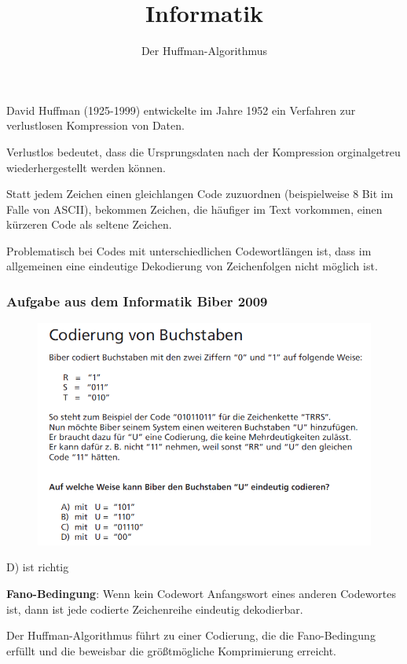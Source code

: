 \documentclass{beamer}
\begin{document}
\title{Informatik}   
\author{Der Huffman-Algorithmus} 
\date{}
\frame{\titlepage} 


\begin{frame}[fragile]
David Huffman (1925-1999) entwickelte im Jahre 1952 ein Verfahren zur verlustlosen Kompression von Daten.  

Verlustlos bedeutet, dass die Ursprungsdaten nach der Kompression orginalgetreu wiederhergestellt 
werden können. \pause

Statt jedem Zeichen einen gleichlangen Code zuzuordnen (beispielweise 8 Bit im Falle von ASCII), bekommen Zeichen, die häufiger im Text vorkommen, einen kürzeren Code als seltene Zeichen.  

Problematisch bei Codes mit unterschiedlichen Codewortlängen ist,  dass im allgemeinen eine eindeutige Dekodierung von Zeichenfolgen nicht möglich ist. 
\end{frame}

\begin{frame}
\frametitle{Aufgabe aus dem Informatik Biber 2009}
\begin{figure}[h]
	\centering
		\includegraphics[scale=0.6]{BiberCode.png}
\end{figure}
\pause
D) ist richtig
\end{frame}


\begin{frame}
\textbf{Fano-Bedingung}: Wenn kein Codewort Anfangswort eines anderen Codewortes ist,
dann ist jede codierte Zeichenreihe eindeutig dekodierbar.

Der Huffman-Algorithmus führt zu einer Codierung, die die Fano-Bedingung erfüllt und die
beweisbar die größtmögliche Komprimierung erreicht.
\end{frame}
\end{document}
